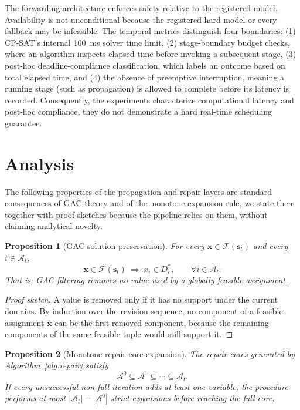 \documentclass[pdflatex,sn-mathphys-num,iicol,oneside]{sn-jnl}
\newcommand{\gac}{\textsc{GAC}\xspace}
\newcommand{\cpsat}{\textsc{CP-SAT}\xspace}
\newtheorem{proposition}{Proposition}
\begin{document}
The forwarding architecture enforces safety relative to the registered
model. Availability is not unconditional because the registered hard
model or every fallback may be infeasible. The temporal metrics distinguish four boundaries: (1) \cpsat's internal 100~ms solver time limit, (2) stage-boundary budget checks, where an algorithm inspects elapsed time before invoking a subsequent stage, (3) post-hoc deadline-compliance classification, which labels an outcome based on total elapsed time, and (4) the absence of preemptive interruption, meaning a running stage (such as propagation) is allowed to complete before its latency is recorded. Consequently, the experiments characterize
computational latency and post-hoc compliance, they do not demonstrate
a hard real-time scheduling guarantee.

\section{Analysis}
\label{sec:analysis}

The following properties of the propagation and repair layers are
standard consequences of \gac theory and of the monotone expansion
rule, we state them together with proof sketches because the pipeline
relies on them, without claiming analytical novelty.

\begin{proposition}[\gac solution preservation]
\label{prop:preservation}
For every $\bm{x}\in\mathcal{F}(\bm{s}_t)$ and every
$i\in\mathcal{A}_t$,
\begin{equation}
\bm{x}\in\mathcal{F}(\bm{s}_t)
\;\Longrightarrow\;
x_i\in D_i^{*},
\qquad
\forall i\in\mathcal{A}_t .
\end{equation}
That is, \gac filtering removes no value used by a globally feasible
assignment.
\end{proposition}

\begin{proof}[Proof sketch]
A value is removed only if it has no support under the current
domains. By induction over the revision sequence, no component of a
feasible assignment $\bm{x}$ can be the first removed component,
because the remaining components of the same feasible tuple would
still support it.
\end{proof}

\begin{proposition}[Monotone repair-core expansion]
\label{prop:monotone}
The repair cores generated by Algorithm~\ref{alg:repair} satisfy
\begin{equation}
\mathcal{A}^{0}\subseteq\mathcal{A}^{1}\subseteq\cdots
\subseteq\mathcal{A}_t .
\end{equation}
If every unsuccessful non-full iteration adds at least one variable,
the procedure performs at most
$|\mathcal{A}_t|-|\mathcal{A}^{0}|$ strict expansions before reaching
the full core.
\end{proposition}
\end{document}
